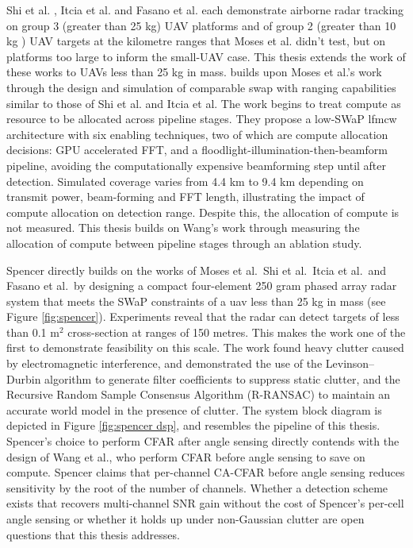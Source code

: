 Shi et al. \cite{6712628}, Itcia et al. \cite{fmcw_itcia_2013} 
and Fasano et al. \cite{Giancarmine2016} each demonstrate airborne 
radar tracking on group 3 (greater than 25 kg) UAV platforms and of group 2 
(greater than 10 kg \cite{DoD2013UASRoadmap}) UAV targets at the kilometre 
ranges that Moses et al. 
didn't test, but on platforms too large to inform the small-UAV case. This 
thesis extends the work of these works to UAVs less than 25 kg in mass. 
\cite{Wang2016} builds upon Moses et al.'s work through the 
design and simulation of comparable \gls{swap} with  
ranging capabilities similar to those of Shi et al. and Itcia et al. 
The work begins to treat compute as resource to be allocated across
pipeline stages. They propose a low-SWaP \gls{lfmcw} architecture 
with six enabling techniques, two of which are compute allocation 
decisions: GPU accelerated FFT, and a floodlight-illumination-then-beamform
pipeline, avoiding the computationally expensive beamforming step until 
after detection. Simulated coverage varies from 4.4 km to 9.4 km depending 
on transmit power, beam-forming and FFT length, illustrating the impact of compute
allocation on detection range. Despite this, the allocation of compute is 
not measured. This thesis builds on Wang's work through measuring the allocation 
of compute between pipeline stages through an ablation study.

Spencer directly builds on the works of Moses et al.\, Shi et al.\, Itcia et al.\, 
and Fasano et al.\ by designing a compact four-element 250 gram phased array radar 
system that meets the SWaP constraints of a \gls{uav} less than 25 kg in mass 
\cite{compact_spencer_2015} (see Figure \ref{fig:spencer}).
Experiments reveal that the radar can detect targets of less than 0.1 m$^2$ 
cross-section at ranges of 150 metres. This makes the work one of the first
to demonstrate feasibility on this scale. The work found heavy 
clutter caused by electromagnetic interference, and demonstrated 
the use of the Levinson--Durbin algorithm to generate filter coefficients
\cite{levinson1947wiener, durbin1960fitting} 
to suppress static clutter, and the Recursive Random Sample
Consensus Algorithm (R-RANSAC) to maintain an accurate 
world model in the presence of clutter. The system block 
diagram is depicted in Figure \ref{fig:spencer dsp}, and 
resembles the pipeline of this thesis. Spencer's choice to 
perform CFAR after angle sensing directly contends with the design 
of Wang et al., who perform CFAR before angle sensing to save on compute. 
Spencer claims that per-channel CA-CFAR before angle sensing reduces 
sensitivity by the root of the number of channels. Whether a 
detection scheme exists that 
recovers multi-channel SNR gain without the cost of Spencer's per-cell 
angle sensing 
or whether it holds up under non-Gaussian clutter are open questions that this 
thesis addresses.

